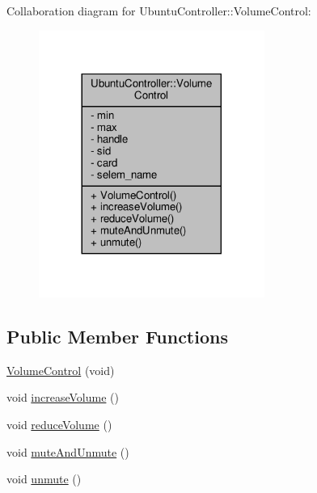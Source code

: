 Collaboration diagram for Ubuntu\+Controller\+:\+:Volume\+Control\+:
\nopagebreak
\begin{figure}[H]
\begin{center}
\leavevmode
\includegraphics[width=209pt]{class_ubuntu_controller_1_1_volume_control__coll__graph}
\end{center}
\end{figure}
\subsection*{Public Member Functions}
\begin{DoxyCompactItemize}
\item 
\hyperlink{class_ubuntu_controller_1_1_volume_control_a3cc73bb232bd87f8385da0440126c38c}{Volume\+Control} (void)
\item 
void \hyperlink{class_ubuntu_controller_1_1_volume_control_a6b51293368c1740b9bee0b8a4e7ed421}{increase\+Volume} ()
\item 
void \hyperlink{class_ubuntu_controller_1_1_volume_control_ad8e3e3740268388e906984fa807761a1}{reduce\+Volume} ()
\item 
void \hyperlink{class_ubuntu_controller_1_1_volume_control_a77273bc06d0f25068045860b0c6b4f91}{mute\+And\+Unmute} ()
\item 
void \hyperlink{class_ubuntu_controller_1_1_volume_control_a4a541c510e22cd07b206ca80f979c1a1}{unmute} ()
\end{DoxyCompactItemize}
